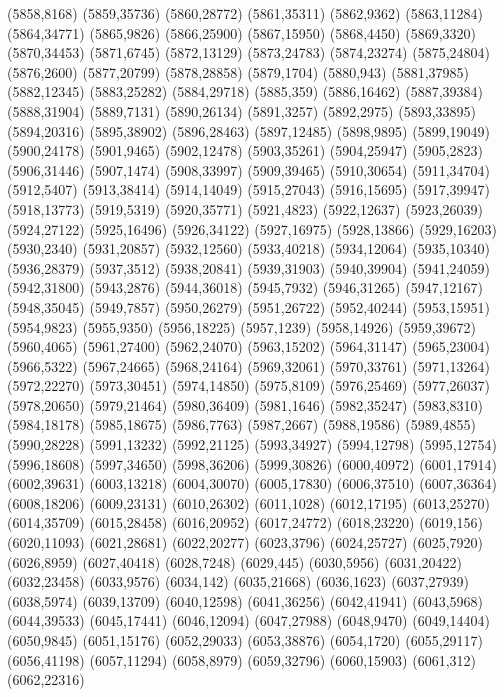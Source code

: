 (5858,8168)
(5859,35736)
(5860,28772)
(5861,35311)
(5862,9362)
(5863,11284)
(5864,34771)
(5865,9826)
(5866,25900)
(5867,15950)
(5868,4450)
(5869,3320)
(5870,34453)
(5871,6745)
(5872,13129)
(5873,24783)
(5874,23274)
(5875,24804)
(5876,2600)
(5877,20799)
(5878,28858)
(5879,1704)
(5880,943)
(5881,37985)
(5882,12345)
(5883,25282)
(5884,29718)
(5885,359)
(5886,16462)
(5887,39384)
(5888,31904)
(5889,7131)
(5890,26134)
(5891,3257)
(5892,2975)
(5893,33895)
(5894,20316)
(5895,38902)
(5896,28463)
(5897,12485)
(5898,9895)
(5899,19049)
(5900,24178)
(5901,9465)
(5902,12478)
(5903,35261)
(5904,25947)
(5905,2823)
(5906,31446)
(5907,1474)
(5908,33997)
(5909,39465)
(5910,30654)
(5911,34704)
(5912,5407)
(5913,38414)
(5914,14049)
(5915,27043)
(5916,15695)
(5917,39947)
(5918,13773)
(5919,5319)
(5920,35771)
(5921,4823)
(5922,12637)
(5923,26039)
(5924,27122)
(5925,16496)
(5926,34122)
(5927,16975)
(5928,13866)
(5929,16203)
(5930,2340)
(5931,20857)
(5932,12560)
(5933,40218)
(5934,12064)
(5935,10340)
(5936,28379)
(5937,3512)
(5938,20841)
(5939,31903)
(5940,39904)
(5941,24059)
(5942,31800)
(5943,2876)
(5944,36018)
(5945,7932)
(5946,31265)
(5947,12167)
(5948,35045)
(5949,7857)
(5950,26279)
(5951,26722)
(5952,40244)
(5953,15951)
(5954,9823)
(5955,9350)
(5956,18225)
(5957,1239)
(5958,14926)
(5959,39672)
(5960,4065)
(5961,27400)
(5962,24070)
(5963,15202)
(5964,31147)
(5965,23004)
(5966,5322)
(5967,24665)
(5968,24164)
(5969,32061)
(5970,33761)
(5971,13264)
(5972,22270)
(5973,30451)
(5974,14850)
(5975,8109)
(5976,25469)
(5977,26037)
(5978,20650)
(5979,21464)
(5980,36409)
(5981,1646)
(5982,35247)
(5983,8310)
(5984,18178)
(5985,18675)
(5986,7763)
(5987,2667)
(5988,19586)
(5989,4855)
(5990,28228)
(5991,13232)
(5992,21125)
(5993,34927)
(5994,12798)
(5995,12754)
(5996,18608)
(5997,34650)
(5998,36206)
(5999,30826)
(6000,40972)
(6001,17914)
(6002,39631)
(6003,13218)
(6004,30070)
(6005,17830)
(6006,37510)
(6007,36364)
(6008,18206)
(6009,23131)
(6010,26302)
(6011,1028)
(6012,17195)
(6013,25270)
(6014,35709)
(6015,28458)
(6016,20952)
(6017,24772)
(6018,23220)
(6019,156)
(6020,11093)
(6021,28681)
(6022,20277)
(6023,3796)
(6024,25727)
(6025,7920)
(6026,8959)
(6027,40418)
(6028,7248)
(6029,445)
(6030,5956)
(6031,20422)
(6032,23458)
(6033,9576)
(6034,142)
(6035,21668)
(6036,1623)
(6037,27939)
(6038,5974)
(6039,13709)
(6040,12598)
(6041,36256)
(6042,41941)
(6043,5968)
(6044,39533)
(6045,17441)
(6046,12094)
(6047,27988)
(6048,9470)
(6049,14404)
(6050,9845)
(6051,15176)
(6052,29033)
(6053,38876)
(6054,1720)
(6055,29117)
(6056,41198)
(6057,11294)
(6058,8979)
(6059,32796)
(6060,15903)
(6061,312)
(6062,22316)
